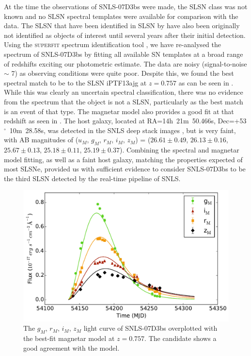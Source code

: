 At the time the observations of SNLS-07D3bs were made, the SLSN class was not known and no SLSN spectral templates were available for comparison with the data. The SLSN that have been identified in SLSN by \citet{Howell2013} have also been originally not identified as objects of interest until several years after their initial detection. Using the \textsc{superfit} spectrum identification tool \citep{Howell2005}, we have re-analysed the spectrum of SNLS-07D3bs by fitting all available SN templates at a broad range of redshifts exciting our photometric estimate. The data are noisy (signal-to-noise $\sim$ 7) as observing conditions were quite poor. Despite this, we found the best spectral match to be to the SLSN iPTF13ajg at $z=0.757$ as can be seen in . While this was clearly an uncertain spectral classification, there was no evidence from the spectrum that the object is not a SLSN, particularly as the best match is an event of that type. The magnetar model also provides a good fit at that redshift as seen in  . The host galaxy, located at RA=14h~21m~50.466s, Dec=+53$^{\circ}$~10m~28.58s, was detected in the SNLS deep stack images \citep{Ilbert2006}, but is very faint, with AB magnitudes of ($u_M$, $g_M$, $r_M$, $i_M$, $z_M$) = ($26.61\pm0.49$, $26.13\pm0.16$, $25.67\pm0.13$, $25.18\pm0.11$, $25.19\pm0.37$). Combining the spectral and magnetar model fitting, as well as a faint host galaxy, matching the properties expected of most SLSNe, provided us with sufficient evidence to consider SNLS-07D3bs to be the third SLSN detected by the real-time pipeline of SNLS.

\begin{figure}
\centering
\includegraphics[scale=0.5]{Figures/Chapter3/07D3bs}
\caption{The $g_M$, $r_M$, $i_M$, $z_M$ light curve of SNLS-07D3bs overplotted with the best-fit magnetar model at $z=0.757$. The candidate shows a good agreement with the model.}
\label{fig:07D3bsLC}
\end{figure}

